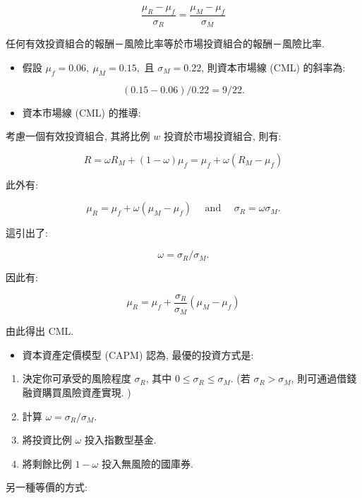 \documentclass[letterpaper]{article}
\begin{document}
		
		$$
		\frac{\mu_{R}-\mu_{f}}{\sigma_{R}}=\frac{\mu_{M}-\mu_{f}}{\sigma_{M}}
		$$
		
		任何有效投資組合的報酬－風險比率等於市場投資組合的報酬－風險比率. 
		
		\begin{itemize}
			\item 假設 $\mu_{f} = 0.06, \ \mu_{M} = 0.15, $ 且 $\sigma_{M} = 0.22$, 則資本市場線 (CML) 的斜率為: 
		\end{itemize}
		
		
		$$
		(0.15-0.06) / 0.22=9 / 22 .
		$$
		\begin{itemize}
			\item 資本市場線 (CML) 的推導: 
		\end{itemize}
		
		考慮一個有效投資組合, 其將比例 $w$ 投資於市場投資組合, 則有: 
		
		$$
		R=\omega R_{M}+ (1-\omega) \mu_{f}=\mu_{f}+\omega\left (R_{M}-\mu_{f}\right) 
		$$
		
		此外有: 
		
		$$
		\mu_{R}=\mu_{f}+\omega\left (\mu_{M}-\mu_{f}\right) \quad \text { and } \quad \sigma_{R}=\omega \sigma_{M} .
		$$
		
		這引出了: 
		
		$$
		\omega=\sigma_{R} / \sigma_{M} .
		$$
		
		因此有: 
		
		$$
		\mu_{R}=\mu_{f}+\frac{\sigma_{R}}{\sigma_{M}}\left (\mu_{M}-\mu_{f}\right) 
		$$
		
		由此得出 CML. 
		
		
		\begin{itemize}
			\item 資本資產定價模型 (CAPM) 認為, 最優的投資方式是: 
		\end{itemize}
		
		\begin{enumerate}
			\item 決定你可承受的風險程度 $\sigma_{R}$, 其中 $0 \leq \sigma_{R} \leq \sigma_{M}$. 
			(若 $\sigma_{R}>\sigma_{M}$, 則可通過借錢融資購買風險資產實現. ) 
			\item 計算 $\omega=\sigma_{R} / \sigma_{M}$. 
			\item 將投資比例 $\omega$ 投入指數型基金. 
			\item 將剩餘比例 $1-\omega$ 投入無風險的國庫券. 
		\end{enumerate}
		
		另一種等價的方式: 
		
\end{document}
